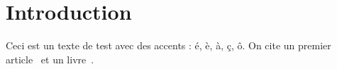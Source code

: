 
\section{Introduction}

Ceci est un texte de test avec des accents : é, è, à, ç, ô.
On cite un premier article~\cite{article1} et un livre~\cite{livre1}.

